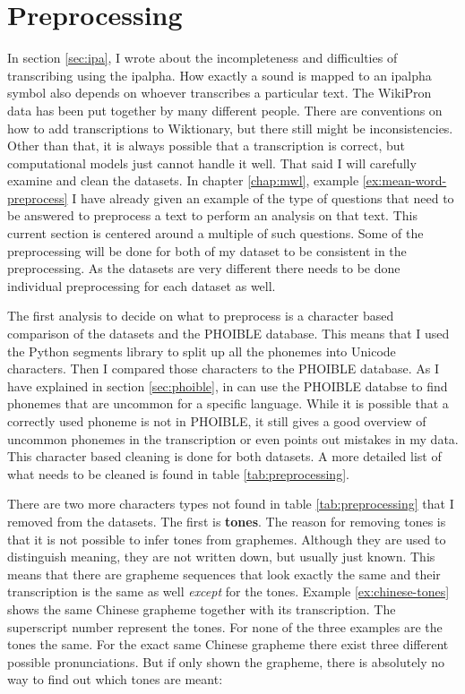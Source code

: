 \section{Preprocessing}
\label{preprocess}
In section \ref{sec:ipa}, I wrote about the incompleteness and difficulties of transcribing using the \ac{ipalpha}. How exactly a sound is mapped to an \ac{ipalpha} symbol also depends on whoever transcribes a particular text. The WikiPron data has been put together by many different people. There are conventions on how to add transcriptions to Wiktionary, but there still might be inconsistencies. Other than that, it is always possible that a transcription is correct, but computational models just cannot handle it well. That said I will carefully examine and clean the datasets. In chapter \ref{chap:mwl}, example \ref{ex:mean-word-preprocess} I have already given an example of the type of questions that need to be answered to preprocess a text to perform an analysis on that text. This current section is centered around a multiple of such questions.
Some of the preprocessing will be done for both of my dataset to be consistent in the preprocessing. As the datasets are very different there needs to be done individual preprocessing for each dataset as well.

The first analysis to decide on what to preprocess is a character based comparison of the datasets and the PHOIBLE database. This means that I used the Python segments library to split up all the phonemes into Unicode characters. Then I compared those characters to the PHOIBLE database. As I have explained in section \ref{sec:phoible}, in can use the PHOIBLE databse to find phonemes that are uncommon for a specific language. While it is possible that a correctly used phoneme is not in PHOIBLE, it still gives a good overview of uncommon phonemes in the transcription or even points out mistakes in my data. This character based cleaning is done for both datasets. A more detailed list of what needs to be cleaned is found in table \ref{tab:preprocessing}.

There are two more characters types not found in table \ref{tab:preprocessing} that I removed from the datasets. The first is \textbf{tones}. The reason for removing tones is that it is not possible to infer tones from graphemes. Although they are used to distinguish meaning, they are not written down, but usually just known. This means that there are grapheme sequences that look exactly the same and their transcription is the same as well \textit{except} for the tones. Example \ref{ex:chinese-tones} shows the same Chinese grapheme together with its transcription. The superscript number represent the tones. For none of the three examples are the tones the same. For the exact same Chinese grapheme there exist three different possible pronunciations. But if only shown the grapheme, there is absolutely no way to find out which tones are meant:

